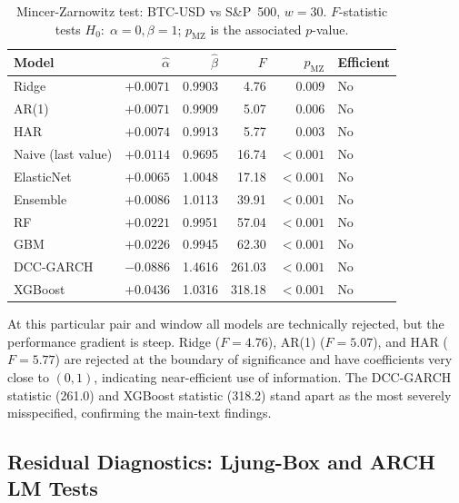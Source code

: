 \begin{table}[H]
    \centering
    \caption{Mincer-Zarnowitz test: BTC-USD vs S\&P~500, $w = 30$.
             $F$-statistic tests $H_0{:}\;\alpha=0, \beta=1$; $p_\text{MZ}$ is
             the associated $p$-value.}
    \label{tab:mz_gspc_w30}
    \begin{tabular}{lrrrrl}
        \toprule
        Model & $\hat{\alpha}$ & $\hat{\beta}$ & $F$ & $p_\text{MZ}$ & Efficient \\
        \midrule
        Ridge       & $+0.0071$ & 0.9903 &   4.76 & 0.009 & No  \\
        AR(1)         & $+0.0071$ & 0.9909 &   5.07 & 0.006 & No  \\
        HAR         & $+0.0074$ & 0.9913 &   5.77 & 0.003 & No  \\
        Naive (last value) & $+0.0114$ & 0.9695 &  16.74 & $<0.001$ & No  \\
        ElasticNet  & $+0.0065$ & 1.0048 &  17.18 & $<0.001$ & No  \\
        Ensemble    & $+0.0086$ & 1.0113 &  39.91 & $<0.001$ & No  \\
        RF          & $+0.0221$ & 0.9951 &  57.04 & $<0.001$ & No  \\
        GBM         & $+0.0226$ & 0.9945 &  62.30 & $<0.001$ & No  \\
        DCC-GARCH  & $-0.0886$ & 1.4616 & 261.03 & $<0.001$ & No  \\
        XGBoost    & $+0.0436$ & 1.0316 & 318.18 & $<0.001$ & No  \\
        \bottomrule
    \end{tabular}
\end{table}

At this particular pair and window all models are technically rejected, but the
performance gradient is steep. Ridge ($F = 4.76$), AR(1) ($F = 5.07$), and HAR
($F = 5.77$) are rejected at the boundary of significance and have coefficients
very close to $(0, 1)$, indicating near-efficient use of information. The
DCC-GARCH statistic (261.0) and XGBoost statistic (318.2) stand apart as the
most severely misspecified, confirming the main-text findings.

\subsection{Residual Diagnostics: Ljung-Box and ARCH LM Tests}

